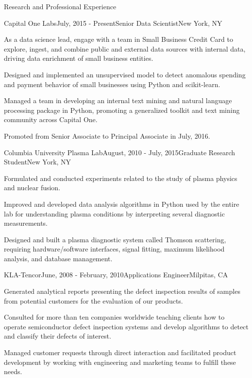 \documentclass{resume} %
\begin{document}
\begin{rSection}{Research and Professional Experience}

\begin{rSubsection}{Capital One Labs}{July, 2015 - Present}{Senior Data Scientist}{New York, NY}
\item As a data science lead, engage with a team in Small Business Credit Card to explore, ingest, and combine public and external data sources with internal data, driving data enrichment of small business entities.  %
\item Designed and implemented an unsupervised model to detect anomalous spending and payment behavior of small businesses using Python and scikit-learn.
\item Managed a team in developing an internal text mining and natural language processing package in Python, promoting a generalized toolkit and text mining community across Capital One.
\item Promoted from Senior Associate to Principal Associate in July, 2016.
\end{rSubsection}


\begin{rSubsection}{Columbia University Plasma Lab}{August, 2010 - July, 2015}{Graduate Research Student}{New York, NY}
\item Formulated and conducted experiments related to the study of plasma physics and nuclear fusion.  
\item Improved and developed data analysis algorithms in Python used by the entire lab for understanding plasma conditions by interpreting several diagnostic measurements. %
\item Designed and built a plasma diagnostic system called Thomson scattering, requiring hardware/software interfaces, signal fitting, maximum likelihood analysis, and database management.
\end{rSubsection}


\begin{rSubsection}{KLA-Tencor}{June, 2008 - February, 2010}{Applications Engineer}{Milpitas, CA}
\item Generated analytical reports presenting the defect inspection results of samples from potential customers for the evaluation of our products. 
\item Consulted for more than ten companies worldwide teaching clients how to operate semiconductor defect inspection systems and develop algorithms to detect and classify their defects of interest.
\item Managed customer requests through direct interaction and facilitated product development by working with engineering and marketing teams to fulfill these needs.
\end{rSubsection}



\end{rSection}
\end{document}
